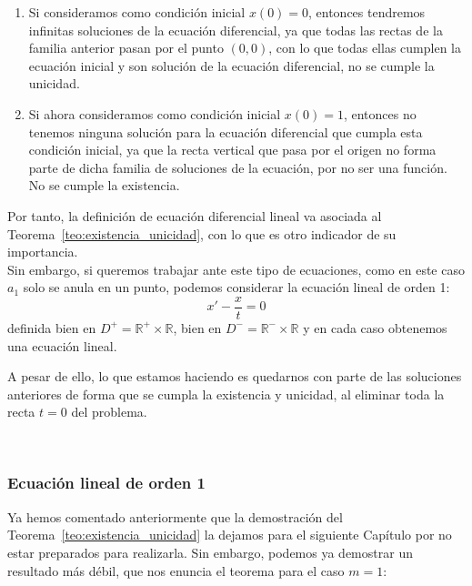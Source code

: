 \begin{ejemplo}
    \begin{enumerate}
        \item Si consideramos como condición inicial $x(0) = 0$, entonces tendremos infinitas soluciones de la ecuación diferencial, ya que todas las rectas de la familia anterior pasan por el punto $(0,0)$, con lo que todas ellas cumplen la ecuación inicial y son solución de la ecuación diferencial, no se cumple la unicidad.
        \item Si ahora consideramos como condición inicial $x(0)=1$, entonces no tenemos ninguna solución para la ecuación diferencial que cumpla esta condición inicial, ya que la recta vertical que pasa por el origen no forma parte de dicha familia de soluciones de la ecuación, por no ser una función. No se cumple la existencia.
    \end{enumerate}
    Por tanto, la definición de ecuación diferencial lineal va asociada al Teorema~\ref{teo:existencia_unicidad}, con lo que es otro indicador de su importancia.\\

    Sin embargo, si queremos trabajar ante este tipo de ecuaciones, como en este caso $a_1$ solo se anula en un punto, podemos considerar la ecuación lineal de orden 1:
    \begin{equation*}
        x' - \dfrac{x}{t} = 0
    \end{equation*}
    definida bien en $D^+ = \mathbb{R}^+\times \mathbb{R}$, bien en $D^- = \mathbb{R}^-\times \mathbb{R}$ y en cada caso obtenemos una ecuación lineal.

    A pesar de ello, lo que estamos haciendo es quedarnos con parte de las soluciones anteriores de forma que se cumpla la existencia y unicidad, al eliminar toda la recta $t=0$ del problema.
\end{ejemplo}~\\

\subsubsection{Ecuación lineal de orden 1}
Ya hemos comentado anteriormente que la demostración del Teorema~\ref{teo:existencia_unicidad} la dejamos para el siguiente Capítulo por no estar preparados para realizarla. Sin embargo, podemos ya demostrar un resultado más débil, que nos enuncia el teorema para el caso $m=1$:

